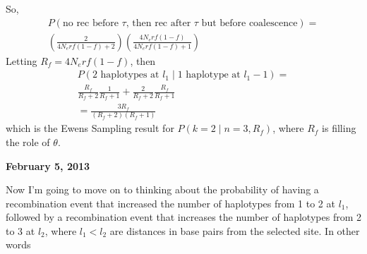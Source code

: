 \documentclass[reqno]{amsart}
\begin{document}
So,
\begin{align}
	P(\text{no rec before }\tau \text{, then rec after } \tau \text{ but before coalescence}) = \\
	\left(\frac{2}{4N_erf(1-f) + 2}\right)\left(\frac{4N_e r f (1-f)}{4N_e r f (1-f) + 1}\right)
\end{align}
Letting $R_f = 4N_e r f (1-f)$, then
\begin{align}
	P(\text{2 haplotypes at } l_1 \mid  \text{1 haplotype at } l_1-1) = \\
	\frac{R_f}{R_f+2}\frac{1}{R_f+1} + \frac{2}{R_f + 2}\frac{R_f}{R_f+1} \\
	= \frac{3R_f}{(R_f+2)(R_f+1)}
\end{align}
which is the Ewens Sampling result for $P(k=2\mid n=3,R_f)$, where $R_f$ is filling the role of $\theta$.

\newpage
\begin{flushright}
	\textbf{February 5, 2013}
\end{flushright}

Now I'm going to move on to thinking about the probability of having a recombination event that increased the number of haplotypes from 1 to 2 at $l_1$, followed by a recombination event that increases the number of haplotypes from 2 to 3 at $l_2$, where $l_1 < l_2$ are distances in base pairs from the selected site. In other words
\end{document}

